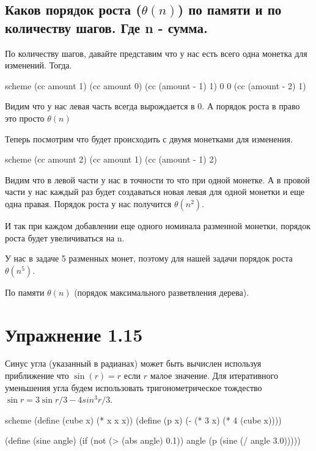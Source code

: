 \section{Каков порядок роста ($\theta(n)$) по памяти и по количеству шагов. Где n - сумма.}

По количеству шагов, давайте представим что у нас есть всего одна монетка для изменений. Тогда.

\begin{codelisting}{scheme}
        (cc amount 1)
  (cc amount 0)  (cc (amount - 1) 1)
0                0     (cc (amount - 2) 1)
\end{codelisting}

Видим что у нас левая часть всегда вырождается в 0. А порядок роста в право это просто $\theta(n)$

Теперь посмотрим что будет происходить с двумя монетками для изменения.

\begin{codelisting}{scheme}
        (cc amount 2)
  (cc amount 1)  (cc (amount - 1) 2)
\end{codelisting}

Видим что в левой части у нас в точности то что при одной монетке. А в провой части у нас каждый раз будет создаваться новая левая для одной монетки и еще одна правая. Порядок роста у нас получится $\theta(n^2)$.

И так при каждом добавлении еще одного номинала разменной монетки, порядок роста будет увеличиваться на n.

У нас в задаче 5 разменных монет, поэтому для нашей задачи порядок роста $\theta(n^5)$.

По памяти $\theta(n)$ (порядок максимального разветвления дерева).

\chapter{Упражнение 1.15}

Синус угла (указанный в радианах) может быть вычислен используя приближение что $\sin(r) = r$ если $r$ малое значение. Для итеративного уменьшения угла будем использовать тригонометрическое тождество $\sin{r} = 3\sin{r/3} - 4sin^3{r/3}$.

\begin{codelisting}{scheme}
(define (cube x) (* x x x))
(define (p x) (- (* 3 x) (* 4 (cube x))))

(define (sine angle)
   (if (not (> (abs angle) 0.1))
       angle
       (p (sine (/ angle 3.0)))))
\end{codelisting}

